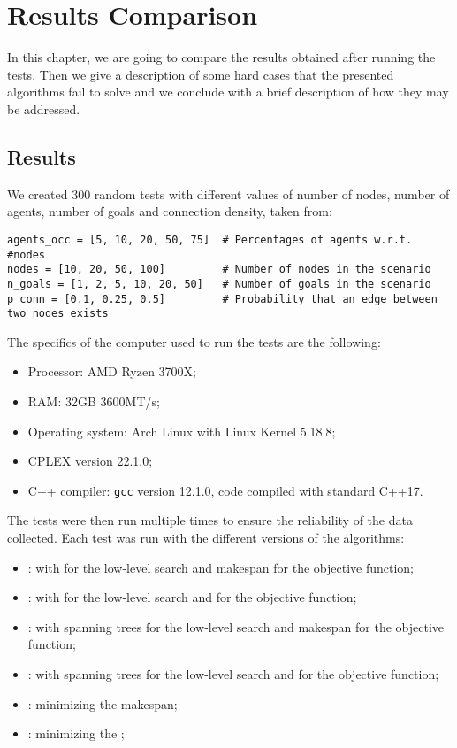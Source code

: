 \chapter{Results Comparison}
\label{ch:results}
In this chapter, we are going to compare the results obtained after running the
tests. Then we give a description of some hard cases that the presented
algorithms fail to solve and we conclude with a brief description of how they
may be addressed.
%
%
%
\section{Results}
We created 300 random tests with different values of number of nodes, number of
agents, number of goals and connection density, taken from:
\begin{verbatim}
agents_occ = [5, 10, 20, 50, 75]  # Percentages of agents w.r.t. #nodes
nodes = [10, 20, 50, 100]         # Number of nodes in the scenario
n_goals = [1, 2, 5, 10, 20, 50]   # Number of goals in the scenario
p_conn = [0.1, 0.25, 0.5]         # Probability that an edge between two nodes exists
\end{verbatim}
The specifics of the computer used to run the tests are the following:
\begin{itemize}
  \item Processor: AMD Ryzen 3700X;
  \item RAM: 32GB 3600MT/s;
  \item Operating system: Arch Linux with Linux Kernel 5.18.8;
  \item CPLEX version 22.1.0;
  \item C++ compiler: \texttt{gcc} version 12.1.0, code compiled with standard
    C++17.
\end{itemize}
The tests were then run multiple times to ensure the reliability of the data
collected. Each test was run with the different versions of the algorithms:
\begin{itemize}
  \item {}:  with  for the low-level
    search and makespan for the objective function;
  \item {}:  with  for the low-level
    search and  for the objective function;
  \item {}:  with spanning trees for the 
    low-level search and makespan for the objective function;
  \item {}:  with spanning trees for the
    low-level search and  for the objective function;
  \item {}:  minimizing the makespan;
  \item {}:  minimizing the ;
\end{itemize}
